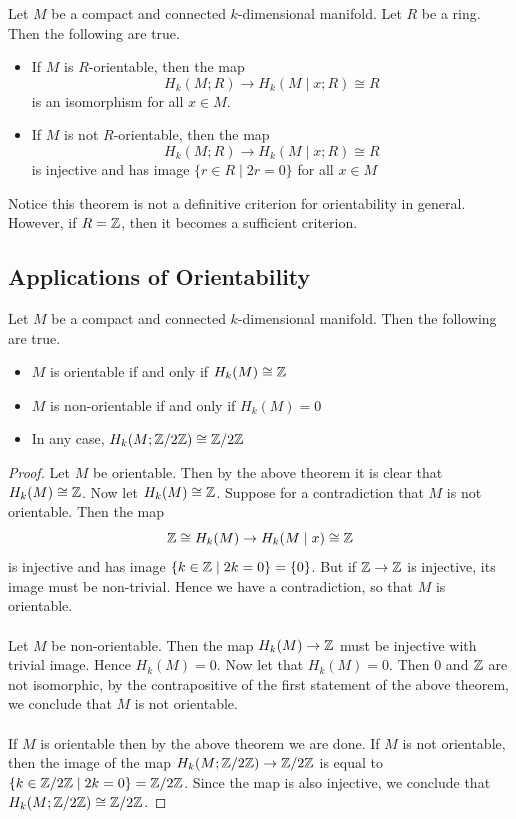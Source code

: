 \documentclass[a4paper]{article}
\begin{document}
\begin{thm}{}{} Let $M$ be a compact and connected $k$-dimensional manifold. Let $R$ be a ring. Then the following are true. 
\begin{itemize}
\item If $M$ is $R$-orientable, then the map $$H_k(M;R)\to H_k(M\;|\;x;R)\cong R$$ is an isomorphism for all $x\in M$. 
\item If $M$ is not $R$-orientable, then the map $$H_k(M;R)\to H_k(M\;|\;x;R)\cong R$$ is injective and has image $\{r\in R\;|\;2r=0\}$ for all $x\in M$
\end{itemize}
\end{thm}

Notice this theorem is not a definitive criterion for orientability in general. However, if $R=\mathbb{Z}$, then it becomes a sufficient criterion. 

\subsection{Applications of Orientability}
\begin{crl}{}{} Let $M$ be a compact and connected $k$-dimensional manifold. Then the following are true. 
\begin{itemize}
\item $M$ is orientable if and only if $H_k(M)\cong\mathbb{Z}$
\item $M$ is non-orientable if and only if $H_k(M)=0$
\item In any case, $H_k(M;\mathbb{Z}/2\mathbb{Z})\cong\mathbb{Z}/2\mathbb{Z}$
\end{itemize} \tcbline
\begin{proof}
Let $M$ be orientable. Then by the above theorem it is clear that $H_k(M)\cong\mathbb{Z}$. Now let $H_k(M)\cong\mathbb{Z}$. Suppose for a contradiction that $M$ is not orientable. Then the map $$\mathbb{Z}\cong H_k(M)\to H_k(M\;|\;x)\cong\mathbb{Z}$$ is injective and has image $\{k\in\mathbb{Z}\;|\;2k=0\}=\{0\}$. But if $\mathbb{Z}\to\mathbb{Z}$ is injective, its image must be non-trivial. Hence we have a contradiction, so that $M$ is orientable. \\~\\

Let $M$ be non-orientable. Then the map $H_k(M)\to\mathbb{Z}$ must be injective with trivial image. Hence $H_k(M)=0$. Now let that $H_k(M)=0$. Then $0$ and $\mathbb{Z}$ are not isomorphic, by the contrapositive of the first statement of the above theorem, we conclude that $M$ is not orientable. \\~\\

If $M$ is orientable then by the above theorem we are done. If $M$ is not orientable, then the image of the map $H_k(M;\mathbb{Z}/2\mathbb{Z})\to\mathbb{Z}/2\mathbb{Z}$ is equal to $\{k\in\mathbb{Z}/2\mathbb{Z}\;|\;2k=0\}=\mathbb{Z}/2\mathbb{Z}$. Since the map is also injective, we conclude that $H_k(M;\mathbb{Z}/2\mathbb{Z})\cong\mathbb{Z}/2\mathbb{Z}$. 
\end{proof}
\end{crl}
\end{document}
